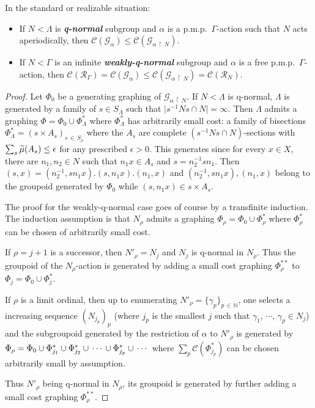 \documentclass[AHL,Unicode,longabstracts,published]{cedram}
\newcommand{\defin}[1]{\textbf{\emph{#1}}}
\newcommand{\Nmath}{\mathbb{N}}
\newcommand{\RR}{\mathcal{R}}
\newcommand{\cost}{\mathcal{C}}
\newcommand{\cg}{\mathcal{G}}
\newcommand{\pmp}{p.m.p.\ }
\let\oldtilde\tilde
\renewcommand*{\tilde}[1]{\mathchoice{\widetilde{#1}}{\widetilde{#1}}{\oldtilde{#1}}{\oldtilde{#1}}}
\begin{document}
\begin{prop}\label{prop:cost q-normal}
In the standard or realizable situation:
\begin{itemize}
\item[--]\label{prop3.2.1} If $N<\Lambda$ is \defin{q-normal} subgroup and $\alpha$ is a \pmp $\Gamma$-action such that $N$ acts aperiodically, then $\cost(\cg_{\alpha})\leq \cost(\cg_{\alpha\,\upharpoonright\,N})$.
\item[--]\label{prop3.2.2} If $N<\Gamma$ is an infinite \defin{weakly-q-normal} subgroup and $\alpha$ is a free \pmp $\Gamma$-action, then $\cost(\RR_\Gamma)= \cost(\cg_{\alpha})\leq \cost(\cg_{\alpha\,\upharpoonright\,N})=\cost(\RR_N)$.
\end{itemize}
\end{prop}



\begin{proof}
Let $\Phi_0$ be a generating graphing of $\cg_{\alpha\,\upharpoonright\,N}$. If $N<\Lambda$ is q-normal, $\Lambda$ is generated by a family of $s\in S_\Lambda$ such that $\vert s^{-1} N s \cap N\vert=\infty$. Then $\Lambda$ admits a graphing $\Phi=\Phi_0\cup \Phi_{\Lambda}^*$ where $\Phi_{\Lambda}^*$ has arbitrarily small cost: a family of bisections $\Phi_{\Lambda}^{*}=(s \times A_s)_{s\,\in\,S_\rho}$ where the $A_s$ are complete $\left(s^{-1} N s \cap N\right)$-sections with $\sum_s \tilde{\mu}(A_s)\linebreak\leq \epsilon$ for any prescribed $\epsilon>0$. This generates since for every $x\in X$, there are $n_1, n_2\in N$ such that $n_1 x\in A_s$ and $s=n_2^{-1}s n_1$. Then $(s,x)= (n_2^{-1}, sn_1 x). (s, n_1x). (n_1,x)$ and $(n_2^{-1}, sn_1 x), (n_1,x)$ belong to the groupoid generated by $\Phi_0$ while $(s, n_1x)\in s \times A_s$.


The proof for the weakly-q-normal case goes of course by a transfinite induction. The induction assumption is that $N_\rho$ admits a graphing $\Phi_\rho=\Phi_0\cup \Phi^*_\rho$ where $\Phi^*_\rho$ can be chosen of arbitrarily small cost.

If $\rho=j+1$ is a successor, then $N'_\rho=N_j$ and $N_j$ is q-normal in $N_\rho$. Thus the groupoid of the $N_\rho$-action is generated by adding a small cost graphing $\Phi^{**}_\rho$ to $\Phi_j=\Phi_0\cup \Phi^*_j$.

If $\rho$ is a limit ordinal, then up to enumerating $N'_\rho=\{\gamma_p\}_{p\,\in\,\Nmath}$, one selects a increasing sequence $(N_{j_p})_p$ (where $j_p$ is the smallest $j$ such that $\gamma_1,\,\cdots,\,\gamma_p\in N_j$) and the subgroupoid generated by the restriction of $\alpha$ to $N'_{\rho}$ is generated by $\Phi_\rho\linebreak=\Phi_0\cup \Phi^*_{j_1}\cup \Phi^*_{j_2}\cup\,\cdots\,\cup \Phi^*_{j_p}\cup\,\cdots$ where $\sum_p \cost(\Phi^*_{j_p})$ can be chosen arbitrarily small by assumption.

Thus $N'_\rho$ being q-normal in $N_\rho$, its groupoid is generated by further adding a small cost graphing $\Phi^{**}_\rho$.
\end{proof}
\end{document}
